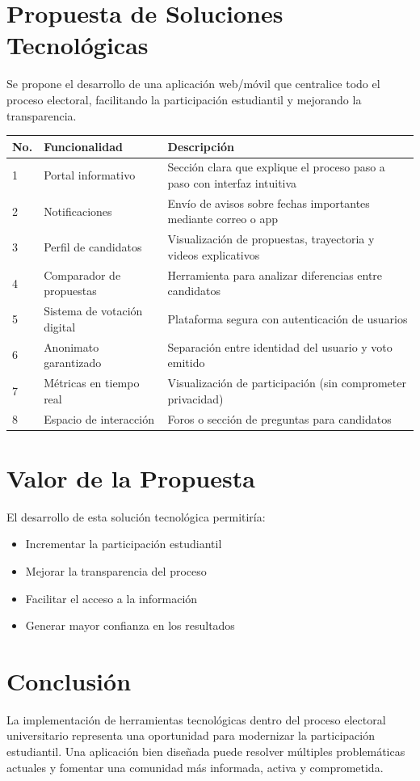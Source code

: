 \documentclass[12pt,letterpaper]{article}
\begin{document}
\section{Propuesta de Soluciones Tecnológicas}

Se propone el desarrollo de una aplicación web/móvil que centralice todo el proceso electoral, facilitando la participación estudiantil y mejorando la transparencia.

\begin{table}[h!]
\centering
\begin{tabular}{p{0.8cm} p{5cm} p{6cm}}
\toprule
\textbf{No.} & \textbf{Funcionalidad} & \textbf{Descripción} \\
\midrule
1 & Portal informativo & Sección clara que explique el proceso paso a paso con interfaz intuitiva \\
2 & Notificaciones & Envío de avisos sobre fechas importantes mediante correo o app \\
3 & Perfil de candidatos & Visualización de propuestas, trayectoria y videos explicativos \\
4 & Comparador de propuestas & Herramienta para analizar diferencias entre candidatos \\
5 & Sistema de votación digital & Plataforma segura con autenticación de usuarios \\
6 & Anonimato garantizado & Separación entre identidad del usuario y voto emitido \\
7 & Métricas en tiempo real & Visualización de participación (sin comprometer privacidad) \\
8 & Espacio de interacción & Foros o sección de preguntas para candidatos \\
\bottomrule
\end{tabular}
\end{table}

\section{Valor de la Propuesta}
El desarrollo de esta solución tecnológica permitiría:
\begin{itemize}
    \item Incrementar la participación estudiantil
    \item Mejorar la transparencia del proceso
    \item Facilitar el acceso a la información
    \item Generar mayor confianza en los resultados
\end{itemize}

\section{Conclusión}
La implementación de herramientas tecnológicas dentro del proceso electoral universitario representa una oportunidad para modernizar la participación estudiantil. Una aplicación bien diseñada puede resolver múltiples problemáticas actuales y fomentar una comunidad más informada, activa y comprometida.
\end{document}
